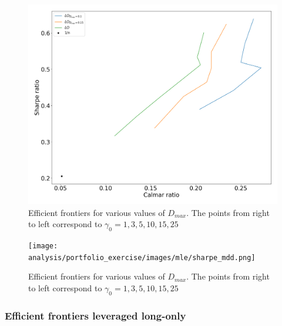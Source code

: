 \begin{figure}[H]
    \centering
    \includegraphics[width=1\textwidth]{analysis/portfolio_exercise/images/mle/sharpe_calmar_lo.png}
    \caption[Efficient frontiers for various values of $D_{max}$]{Efficient frontiers for various values of $D_{max}$. The points from right to left correspond to $\gamma_0=1,3,5,10,15,25$}
    \label{fig:MPC_sharpe_calmar_lo}
\end{figure}

\begin{figure}[H]
    \centering
    \texttt{[image: analysis/portfolio\_exercise/images/mle/sharpe\_mdd.png]}
    \caption[Efficient frontiers for various values of $D_{max}$]{Efficient frontiers for various values of $D_{max}$. The points from right to left correspond to $\gamma_0=1,3,5,10,15,25$}
    \label{fig:MPC_sharpe_mdd_lo}
\end{figure}

\subsubsection*{Efficient frontiers leveraged long-only}

